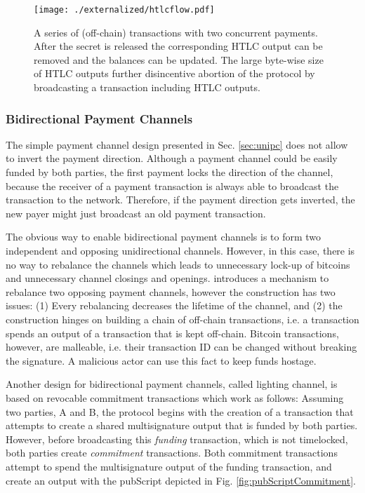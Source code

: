 \begin{figure}
\centering
\texttt{[image: ./externalized/htlcflow.pdf]}
\caption{A series of (off-chain) transactions with two concurrent payments. After the secret is released the corresponding HTLC output can be removed and the balances can be updated. The large byte-wise size of HTLC outputs further disincentive abortion of the protocol by broadcasting a transaction including HTLC outputs.}
\label{fig:htlcflow}
\end{figure}

\subsubsection{Bidirectional Payment Channels}

The simple payment channel design presented in Sec. \ref{sec:unipc} does not allow to invert the payment direction. Although a payment channel could be easily funded by both parties, the first payment locks the direction of the channel, because the receiver of a payment transaction is always able to broadcast the transaction to the network. Therefore, if the payment direction gets inverted, the new payer might just broadcast an old payment transaction.

The obvious way to enable bidirectional payment channels is to form two independent and opposing unidirectional channels. However, in this case, there is no way to rebalance the channels which leads to unnecessary lock-up of bitcoins and unnecessary channel closings and openings.
\cite{decker2015Duplex} introduces a mechanism to rebalance two opposing payment channels, however the construction has two issues: (1) Every rebalancing decreases the lifetime of the channel, and (2) the construction hinges on building a chain of off-chain transactions, i.e. a transaction spends an output of a transaction that is kept off-chain. Bitcoin transactions, however, are malleable, i.e. their transaction ID can be changed without breaking the signature.
A malicious actor can use this fact to keep funds hostage.

Another design for bidirectional payment channels, called lighting channel, is based on revocable commitment transactions which work as follows:
Assuming two parties, A and B, the protocol begins with the creation of a transaction that attempts to create a shared multisignature output that is funded by both parties. However, before broadcasting this \emph{funding} transaction, which is not timelocked, both parties create \emph{commitment} transactions. Both commitment transactions attempt to spend the multisignature output of the funding transaction, and create an output with the pubScript depicted in Fig. \ref{fig:pubScriptCommitment}.

